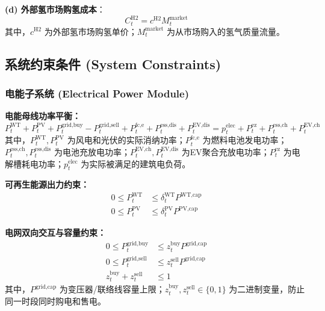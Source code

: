 \documentclass[11pt]{ctexart}
\begin{document}
\textbf{(d) 外部氢市场购氢成本}：
\begin{equation}
C_{t}^{\text{H2}} = c^{\text{H2}} M_{t}^{\text{market}}
\end{equation}
其中，$c^{\text{H2}}$ 为外部氢市场购氢单价；$M_{t}^{\text{market}}$ 为从市场购入的氢气质量流量。

\subsection{系统约束条件 (System Constraints)}

\subsubsection{电能子系统 (Electrical Power Module)}

\textbf{电能母线功率平衡：}
\begin{equation}
P_{t}^{\text{WT}} + P_{t}^{\text{PV}} + P_{t}^{\text{grid,buy}} - P_{t}^{\text{grid,sell}} + P_{t}^{\text{fc,e}} + P_{t}^{\text{ess,dis}} + P_{t}^{\text{EV,dis}} = p_{t}^{\text{elec}} + P_{t}^{\text{ez}} + P_{t}^{\text{ess,ch}} + P_{t}^{\text{EV,ch}}
\end{equation}
其中，$P_{t}^{\text{WT}}, P_{t}^{\text{PV}}$ 为风电和光伏的实际消纳功率；$P_{t}^{\text{fc,e}}$ 为燃料电池发电功率；$P_{t}^{\text{ess,ch}}, P_{t}^{\text{ess,dis}}$ 为电池充放电功率；$P_{t}^{\text{EV,ch}}, P_{t}^{\text{EV,dis}}$ 为EV聚合充放电功率；$P_{t}^{\text{ez}}$ 为电解槽耗电功率；$p_{t}^{\text{elec}}$ 为实际被满足的建筑电负荷。

\textbf{可再生能源出力约束：}
\begin{align}
0 \le P_{t}^{\text{WT}} & \le \delta_{t}^{\text{WT}} P^{\text{WT,cap}} \\
0 \le P_{t}^{\text{PV}} & \le \delta_{t}^{\text{PV}} P^{\text{PV,cap}}
\end{align}

\textbf{电网双向交互与容量约束：}
\begin{align}
0 \le P_{t}^{\text{grid,buy}} & \le z_{t}^{\text{buy}} P^{\text{grid,cap}} \\
0 \le P_{t}^{\text{grid,sell}} & \le z_{t}^{\text{sell}} P^{\text{grid,cap}} \\
z_{t}^{\text{buy}} + z_{t}^{\text{sell}} & \le 1
\end{align}
其中，$P^{\text{grid,cap}}$ 为变压器/联络线容量上限；$z_{t}^{\text{buy}}, z_{t}^{\text{sell}} \in \{0, 1\}$ 为二进制变量，防止同一时段同时购电和售电。
\end{document}
